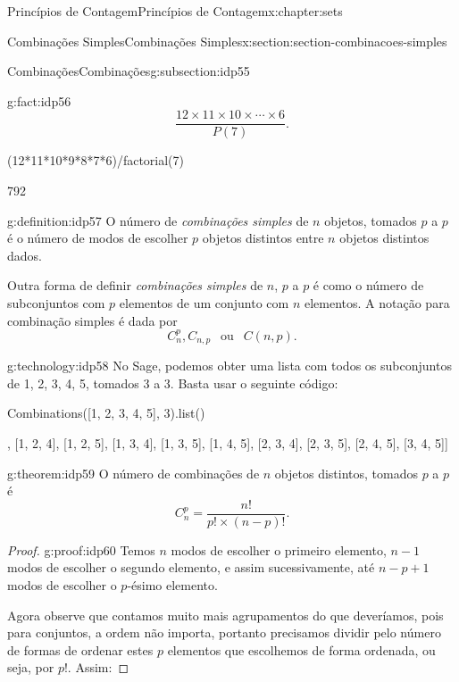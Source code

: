 \documentclass[oneside,10pt,]{book}
\numberwithin{equation}{section}
\begin{document}
\begin{chapterptx}{Princípios de Contagem}{}{Princípios de Contagem}{}{}{x:chapter:sets}
\begin{sectionptx}{Combinações Simples}{}{Combinações Simples}{}{}{x:section:section-combinacoes-simples}
\begin{subsectionptx}{Combinações}{}{Combinações}{}{}{g:subsection:idp55}
\begin{fact}{}{}{g:fact:idp56}
\begin{equation*}
\frac{12\times 11\times 10\times \cdots \times 6}{P(7)}.
\end{equation*}
%
\begin{sageinput}
(12*11*10*9*8*7*6)/factorial(7)
\end{sageinput}
\begin{sageoutput}
792
\end{sageoutput}
\end{fact}
\begin{definition}{}{g:definition:idp57}%
O número de \emph{combinações simples} de \(n\) objetos, tomados \(p\) a \(p\) é o número de modos de escolher \(p\) objetos distintos entre \(n\) objetos distintos dados.%
\par
Outra forma de definir \emph{combinações simples} de \(n\), \(p\) a \(p\) é como o número de subconjuntos com \(p\) elementos de um conjunto com \(n\) elementos. A notação para combinação simples é dada por%
\begin{equation*}
C_n^p, C_{n, p} ~~\text{ ou }~~ C(n, p).
\end{equation*}
%
\end{definition}
\begin{technology}{}{g:technology:idp58}%
No Sage, podemos obter uma lista com todos os subconjuntos de \textbraceleft{}1, 2, 3, 4, 5\textbraceright{}, tomados 3 a 3. Basta usar o seguinte código:%
\begin{sageinput}
Combinations([1, 2, 3, 4, 5], 3).list()
\end{sageinput}
\begin{sageoutput}
[[1, 2, 3],
 [1, 2, 4],
 [1, 2, 5],
 [1, 3, 4],
 [1, 3, 5],
 [1, 4, 5],
 [2, 3, 4],
 [2, 3, 5],
 [2, 4, 5],
 [3, 4, 5]]
\end{sageoutput}
\end{technology}
\begin{theorem}{}{}{g:theorem:idp59}%
O número de combinações de \(n\) objetos distintos, tomados \(p \) a \(p \) é%
\begin{equation*}
C_n^p = \frac{n!}{p!\times(n-p)!}. 
\end{equation*}
\end{theorem}
\begin{proof}{}{g:proof:idp60}
Temos \(n\) modos de escolher o primeiro elemento, \(n-1\) modos de escolher o segundo elemento, e assim sucessivamente, até \(n-p+1\) modos de escolher o \(p\)-ésimo elemento.%
\par
Agora observe que contamos muito mais agrupamentos do que deveríamos, pois para conjuntos, a ordem não importa, portanto precisamos dividir pelo número de formas de ordenar estes \(p\) elementos que escolhemos de forma ordenada, ou seja, por \(p!\). Assim:%

\end{proof}
\end{subsectionptx}
\end{sectionptx}
\end{chapterptx}
\end{document}
